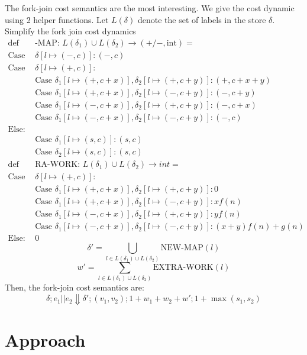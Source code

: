 \documentclass[preprint]{sigplanconf}
\begin{document}
The fork-join cost semantics are the most interesting. We give the cost dynamic using 2 helper functions. Let $L(\delta)$ denote the set of labels in the store $\delta$.
Simplify the fork join cost dynamics
\begin{align*}
\text{def NEW}&\text{-MAP: }L(\delta_1) \cup L(\delta_2) \to (+/-, \text{int}) = \\
\text{Case } &\delta[l \mapsto (-,c)]: (-, c)  \\
\text{Case } &\delta[l \mapsto (+,c)]:  \\
&\text{Case } \delta_1[l \mapsto (+,c+x)], \delta_2[l \mapsto (+,c+y)]: (+, c+x+y) \\
&\text{Case } \delta_1[l \mapsto (+,c+x)], \delta_2[l \mapsto (-,c+y)]: (-, c+y) \\
&\text{Case } \delta_1[l \mapsto (-,c+x)], \delta_2[l \mapsto (+,c+y)]: (-, c+x) \\
&\text{Case } \delta_1[l \mapsto (-,c+x)], \delta_2[l \mapsto (-,c+y)]: (-, c) \\
\text{Else: } & \\
&\text{Case } \delta_1[l \mapsto (s,c)]: (s,c) \\
&\text{Case } \delta_2[l \mapsto (s,c)]: (s,c) \\
\text{def EXT}&\text{RA-WORK: }L(\delta_1) \cup L(\delta_2) \to int = \\
\text{Case } &\delta[l \mapsto (+,c)]:  \\
&\text{Case } \delta_1[l \mapsto (+,c+x)], \delta_2[l \mapsto (+,c+y)]: 0 \\
&\text{Case } \delta_1[l \mapsto (+,c+x)], \delta_2[l \mapsto (-,c+y)]: x f(n) \\
&\text{Case } \delta_1[l \mapsto (-,c+x)], \delta_2[l \mapsto (+,c+y)]: y f(n) \\
&\text{Case } \delta_1[l \mapsto (-,c+x)], \delta_2[l \mapsto (-,c+y)]: (x+y)f(n) + g(n) \\
\text{Else: } & 0
\end{align*}											
$$\delta' = \bigcup_{l \in L(\delta_1) \cup L(\delta_2)} \text{NEW-MAP} (l)$$
$$w' = \sum_{l \in L(\delta_1) \cup L(\delta_2)} \text{EXTRA-WORK} (l)$$
Then, the fork-join cost semantics are:
$$\delta; e_1 || e_2 \Downarrow \delta'; (v_1, v_2); 1 + w_1 + w_2 + w'; 1 + \max(s_1, s_2)$$

\section{Approach}
\end{document}
